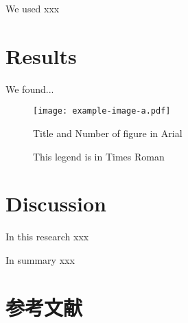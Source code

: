 We used xxx

\section{Results}

We found...

\begin{figure}
    \centering
    \texttt{[image: example-image-a.pdf]}
    \caption{Title and Number of figure in Arial}
    \caption*{This legend is in Times Roman}
  \end{figure}

\section{Discussion}

In this research xxx

In summary xxx

\section*{参考文献}
{\renewcommand{\bibsection}{}
\putbib
}
